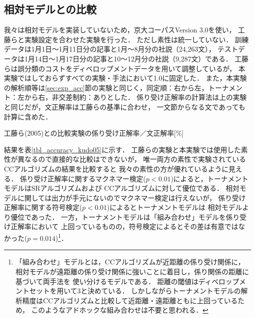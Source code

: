 \documentclass[japanese]{jnlp_1.4}
\begin{document}
\subsection{相対モデルとの比較}

我々は相対モデルを実装していないため，京大コーパスVersion 3.0を使い，
工藤らと実験設定を合わせた実験を行った．
ただし素性は統一していない．
訓練データは1月1日〜1月11日分の記事と1月〜8月分の社説（24,263文），
テストデータは1月14日〜1月17日分の記事と10〜12月分の社説（9,287文）である．
工藤らは誤分類のコストをディベロップメントデータを用いて調整しているが，
本実験ではしておらずすべての実験・手法において1.0に固定した．
また，本実験の解析順等は\ref{sec:exp_acc}節の実験と同じく，同定順：右から左，トーナメント：左から右，非交差制約：ありとした．
係り受け正解率の計算法は上の実験と同じだが，文正解率は工藤らの基準に合わせ，
一文節からなる文であっても計算に含めた．

\begin{table}[t]
\caption{工藤ら(2005)との比較実験の係り受け正解率／文正解率[\%] }
\begin{center}

\end{center}
\label{tbl_accuracy_kudo05}
\end{table} 

結果を表\ref{tbl_accuracy_kudo05}に示す．
工藤らの実験と本実験では使用した素性が異なるので直接的な比較はできないが，
唯一両方の素性で実験されているCCアルゴリズムの結果を比較すると
我々の素性の方が優れているように見える．
係り受け正解率に関するマクネマー検定($p < 0.01$)によると，トーナメントモデルはSRアルゴリズムおよび
CCアルゴリズムに対して優位である．
相対モデルに関しては出力が手元にないのでマクネマー検定は行えないが，
係り受け正解率に関する符号検定($p < 0.01$)によるとトーナメントモデルは
相対モデルより優位であった．
一方，トーナメントモデルは「組み合わせ」モデルを係り受け正解率において
上回っているものの，符号検定によるとその差は有意ではなかった($p = 0.014$)\footnote{
	「組み合わせ」モデルとは，CCアルゴリズムが近距離の係り受け関係に，
	相対モデルが遠距離の係り受け関係に強いことに着目し，係り関係の距離に基づいて両手法を
	使い分けるモデルである．
	距離の閾値はディベロップメントセットを用いて3と決めている．
	しかしながらトーナメントモデルの解析精度はCCアルゴリズムと比較して近距離・遠距離ともに上回っているため，
	このようなアドホックな組み合わせは不要と思われる．}．
\end{document}
